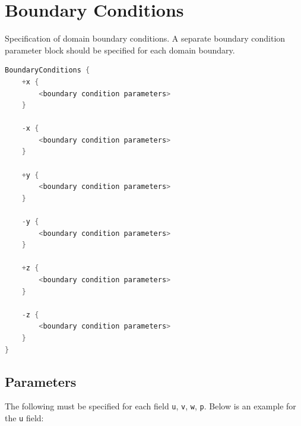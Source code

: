 \section{Boundary Conditions}
Specification of domain boundary conditions. A separate boundary condition parameter block should be specified for each domain boundary.

\begin{lstlisting}[language=C++]
BoundaryConditions {
    +x {
        <boundary condition parameters>
    }
    
    -x {
        <boundary condition parameters>
    }
    
    +y {
        <boundary condition parameters>
    }
    
    -y {
        <boundary condition parameters>
    }
    
    +z {
        <boundary condition parameters>
    }
    
    -z {
        <boundary condition parameters>
    }
}
\end{lstlisting}

\subsection*{Parameters}
The following must be specified for each field \lstinline!u!, \lstinline!v!, \lstinline!w!, \lstinline!p!. Below is an example for the \lstinline!u! field:

